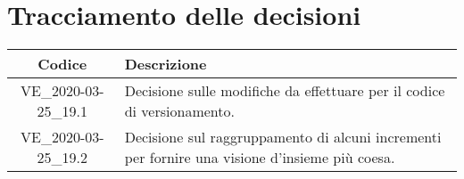 \section*{Tracciamento delle decisioni}

\begin{center}
	\begin{longtable}{|c|p{12.25cm}|}
	\hline
	\rowcolor{lighter-grayer}
	\textbf{Codice} & \textbf{Descrizione} \\
	\hline
	\endfirsthead

	\hline
	VE\_2020-03-25\_19.1 & Decisione sulle modifiche da effettuare per il codice di versionamento. \\
	\hline
	VE\_2020-03-25\_19.2 & Decisione sul raggruppamento di alcuni incrementi per fornire una visione d'insieme più coesa. \\
	\hline

	\end{longtable}
\end{center}
